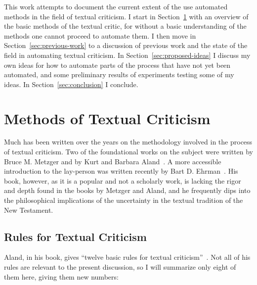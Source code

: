 \documentclass[onecolumn, 12pt]{article}
\newcommand{\secref}[1]{Section~\ref{sec:#1}}
\begin{document}
This work attempts to document the current extent of the use automated methods
in the field of textual criticism.  I start in \secref{methods} with an
overview of the basic methods of the textual critic, for without a basic
understanding of the methods one cannot proceed to automate them.  I then move
in \secref{previous-work} to a discussion of previous work and the state of the
field in automating textual criticism.  In \secref{proposed-ideas} I discuss my
own ideas for how to automate parts of the process that have not yet been
automated, and some preliminary results of experiments testing some of my
ideas.  In \secref{conclusion} I conclude.

\section{Methods of Textual Criticism}
\label{sec:methods}

Much has been written over the years on the methodology involved in the process
of textual criticism.  Two of the foundational works on the subject were
written by Bruce M. Metzger and by Kurt and Barbara
Aland~\cite{metzger-1992-text-of-the-new-testament,
aland-text-of-the-new-testament}.  A more accessible introduction to the
lay-person was written recently by Bart D.
Ehrman~\cite{ehrman-2005-misquoting-jesus}.  His book, however, as it is a
popular and not a scholarly work, is lacking the rigor and depth found in the
books by Metzger and Aland, and he frequently dips into the philosophical
implications of the uncertainty in the textual tradition of the New Testament.

\subsection{Rules for Textual Criticism}

Aland, in his book, gives ``twelve basic rules for textual
criticism''~\cite[pp. 280--282]{aland-text-of-the-new-testament}.  Not all of
his rules are relevant to the present discussion, so I will summarize only
eight of them here, giving them new numbers:
\end{document}
